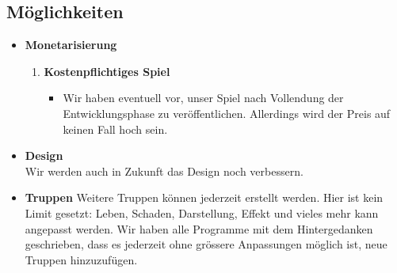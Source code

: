 \subsection{Möglichkeiten}
\begin{itemize}
    \item \textbf{Monetarisierung} \\
    \begin{enumerate}
        \item \textbf{Kostenpflichtiges Spiel}
        \begin{itemize}
            \item Wir haben eventuell vor, unser Spiel nach Vollendung der Entwicklungsphase zu veröffentlichen. Allerdings wird der Preis auf keinen Fall hoch sein.
        \end{itemize}
    \end{enumerate}
    \item \textbf{Design} \\
        Wir werden auch in Zukunft das Design noch verbessern. 
    \item \textbf{Truppen}
        Weitere Truppen können jederzeit erstellt werden. Hier ist kein Limit gesetzt: Leben, Schaden, Darstellung, Effekt und vieles mehr kann angepasst werden. 
        Wir haben alle Programme mit dem Hintergedanken geschrieben, dass es jederzeit ohne grössere Anpassungen möglich ist, neue Truppen hinzuzufügen.
    
\end{itemize}

